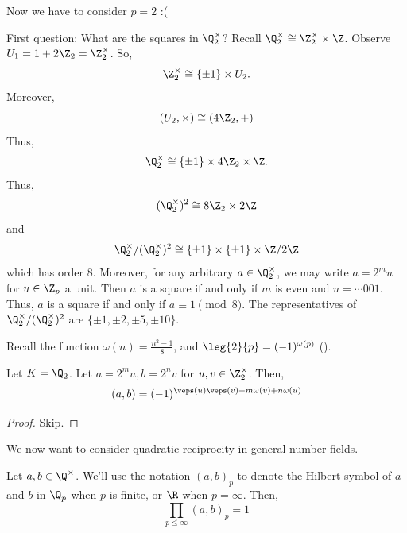Now we have to consider $p=2$ :(

First question: What are the squares in $\Q_2^\times$? Recall $\Q_2^\times \cong \Z_2^\times \times \Z$. Observe $U_1 = 1 + 2\Z_2 = \Z_2^\times$. So,
$$\Z_2^\times \cong \{\pm 1\} \times U_2.$$
Moreover,
$$(U_2,\times) \cong (4\Z_2, +)$$
Thus,
$$\Q_2^\times \cong \{\pm1 \} \times 4\Z_2 \times \Z.$$
Thus,
$$(\Q_2^\times)^2 \cong 8 \Z_2 \times 2\Z$$
and
$$\Q_2^\times /(\Q_2^\times)^2 \cong \{ \pm 1\} \times \{ \pm 1 \} \times \Z/2\Z$$
which has order $8$. Moreover, for any arbitrary $a \in \Q_2^\times$, we may write $a = 2^mu$ for $u \in \Z_p$ a unit. Then $a$ is a square if and only if $m$ is even and $u = \cdots 001$. Thus, $a$ is a square if and only if $a \equiv 1 \pmod 8$. The representatives of $\Q_2^\times / (\Q_2^\times)^2$ are $\{ \pm1, \pm2 , \pm 5, \pm 10\}$.

Recall the function $\omega  (n) = \frac{n^2-1}{8}$, and $\leg{2}{p}=(-1)^{\omega (p)}$ ().

\begin{thm}
    Let $K = \Q_2$. Let $a = 2^mu,b = 2^nv$ for $u,v \in \Z_2^\times$. Then,
    $$(a,b)=(-1)^{\veps (u) \veps (v)+m\omega(v)+n \omega(u)}$$
\end{thm}

\begin{proof}
    Skip.
\end{proof}

We now want to consider quadratic reciprocity in general number fields.

\begin{thm}
    Let $a,b \in \Q^\times$. We'll use the notation $(a,b)_p$ to denote the Hilbert symbol of $a$ and $b$ in $\Q_p$ when $p$ is finite, or $\R$ when $p = \infty$. Then,
    $$\prod _{p \leq \infty}(a,b)_p=1$$
\end{thm}

